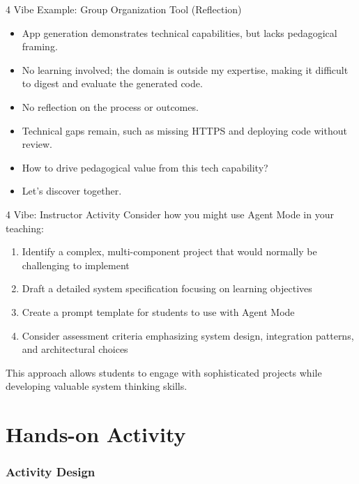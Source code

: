 \documentclass[xcolor=dvipsnames, aspectratio=169]{beamer}
\begin{document}
\begin{frame}{4 Vibe Example: Group Organization Tool (Reflection)}
\begin{itemize}
  \item App generation demonstrates technical capabilities, but lacks pedagogical framing.
  \item No learning involved; the domain is outside my expertise, making it difficult to digest and evaluate the generated code.
  \item No reflection on the process or outcomes.
  \item Technical gaps remain, such as missing HTTPS and deploying code without review.
\end{itemize}

\begin{alertbox}
\begin{itemize}
  \item How to drive pedagogical value from this tech capability? 
  \item Let's discover together.
\end{itemize}  
\end{alertbox}
\end{frame}

\begin{frame}{4 Vibe: Instructor Activity}
  Consider how you might use Agent Mode in your teaching:
  
  \begin{enumerate}
    \item Identify a complex, multi-component project that would normally be challenging to implement
    \item Draft a detailed system specification focusing on learning objectives
    \item Create a prompt template for students to use with Agent Mode
    \item Consider assessment criteria emphasizing system design, integration patterns, and architectural choices
  \end{enumerate}
  
  This approach allows students to engage with sophisticated projects while developing valuable system thinking skills.
\end{frame}

\part[Hands-on Activity]{Hands-on Activity}
\section{Activity Design}
\end{document}
